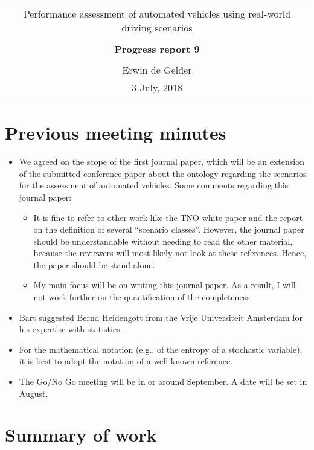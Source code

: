 \documentclass[10pt,final,a4paper,oneside,onecolumn]{article}
\newcommand{\progressreportnumber}{9}
\renewcommand{\author}{Erwin de Gelder}
\renewcommand{\date}{3 July, 2018}
\renewcommand{\title}{Performance assessment of automated vehicles using real-world driving scenarios}
\begin{document}
	
\begin{center}
	\begin{tabular}{c}
		\title \\ \\
		\textbf{\huge Progress report \progressreportnumber} \\ \\
		\author \\ 
		\date
	\end{tabular}
\end{center}

\section{Previous meeting minutes}

\begin{itemize}
	\item We agreed on the scope of the first journal paper, which will be an extension of the submitted conference paper about the ontology regarding the scenarios for the assessment of automated vehicles. Some comments regarding this journal paper:
	\begin{itemize}
		\item It is fine to refer to other work like the TNO white paper and the report on the definition of several ``scenario classes''. However, the journal paper should be understandable without needing to read the other material, because the reviewers will most likely not look at these references. Hence, the paper should be stand-alone.
		\item My main focus will be on writing this journal paper. As a result, I will not work further on the quantification of the completeness.
	\end{itemize}
	\item Bart suggested Bernd Heidengott from the Vrije Universiteit Amsterdam for his expertise with statistics.
	\item For the mathematical notation (e.g., of the entropy of a stochastic variable), it is best to adopt the notation of a well-known reference.
	\item The Go/No Go meeting will be in or around September. A date will be set in August.
\end{itemize}

\section{Summary of work}
\end{document}
